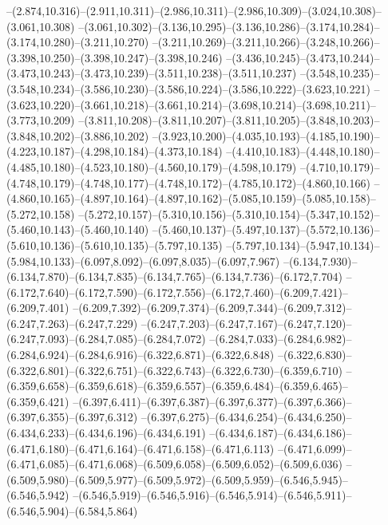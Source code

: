   --(2.874,10.316)--(2.911,10.311)--(2.986,10.311)--(2.986,10.309)--(3.024,10.308)--(3.061,10.308)%
  --(3.061,10.302)--(3.136,10.295)--(3.136,10.286)--(3.174,10.284)--(3.174,10.280)--(3.211,10.270)%
  --(3.211,10.269)--(3.211,10.266)--(3.248,10.266)--(3.398,10.250)--(3.398,10.247)--(3.398,10.246)%
  --(3.436,10.245)--(3.473,10.244)--(3.473,10.243)--(3.473,10.239)--(3.511,10.238)--(3.511,10.237)%
  --(3.548,10.235)--(3.548,10.234)--(3.586,10.230)--(3.586,10.224)--(3.586,10.222)--(3.623,10.221)%
  --(3.623,10.220)--(3.661,10.218)--(3.661,10.214)--(3.698,10.214)--(3.698,10.211)--(3.773,10.209)%
  --(3.811,10.208)--(3.811,10.207)--(3.811,10.205)--(3.848,10.203)--(3.848,10.202)--(3.886,10.202)%
  --(3.923,10.200)--(4.035,10.193)--(4.185,10.190)--(4.223,10.187)--(4.298,10.184)--(4.373,10.184)%
  --(4.410,10.183)--(4.448,10.180)--(4.485,10.180)--(4.523,10.180)--(4.560,10.179)--(4.598,10.179)%
  --(4.710,10.179)--(4.748,10.179)--(4.748,10.177)--(4.748,10.172)--(4.785,10.172)--(4.860,10.166)%
  --(4.860,10.165)--(4.897,10.164)--(4.897,10.162)--(5.085,10.159)--(5.085,10.158)--(5.272,10.158)%
  --(5.272,10.157)--(5.310,10.156)--(5.310,10.154)--(5.347,10.152)--(5.460,10.143)--(5.460,10.140)%
  --(5.460,10.137)--(5.497,10.137)--(5.572,10.136)--(5.610,10.136)--(5.610,10.135)--(5.797,10.135)%
  --(5.797,10.134)--(5.947,10.134)--(5.984,10.133)--(6.097,8.092)--(6.097,8.035)--(6.097,7.967)%
  --(6.134,7.930)--(6.134,7.870)--(6.134,7.835)--(6.134,7.765)--(6.134,7.736)--(6.172,7.704)%
  --(6.172,7.640)--(6.172,7.590)--(6.172,7.556)--(6.172,7.460)--(6.209,7.421)--(6.209,7.401)%
  --(6.209,7.392)--(6.209,7.374)--(6.209,7.344)--(6.209,7.312)--(6.247,7.263)--(6.247,7.229)%
  --(6.247,7.203)--(6.247,7.167)--(6.247,7.120)--(6.247,7.093)--(6.284,7.085)--(6.284,7.072)%
  --(6.284,7.033)--(6.284,6.982)--(6.284,6.924)--(6.284,6.916)--(6.322,6.871)--(6.322,6.848)%
  --(6.322,6.830)--(6.322,6.801)--(6.322,6.751)--(6.322,6.743)--(6.322,6.730)--(6.359,6.710)%
  --(6.359,6.658)--(6.359,6.618)--(6.359,6.557)--(6.359,6.484)--(6.359,6.465)--(6.359,6.421)%
  --(6.397,6.411)--(6.397,6.387)--(6.397,6.377)--(6.397,6.366)--(6.397,6.355)--(6.397,6.312)%
  --(6.397,6.275)--(6.434,6.254)--(6.434,6.250)--(6.434,6.233)--(6.434,6.196)--(6.434,6.191)%
  --(6.434,6.187)--(6.434,6.186)--(6.471,6.180)--(6.471,6.164)--(6.471,6.158)--(6.471,6.113)%
  --(6.471,6.099)--(6.471,6.085)--(6.471,6.068)--(6.509,6.058)--(6.509,6.052)--(6.509,6.036)%
  --(6.509,5.980)--(6.509,5.977)--(6.509,5.972)--(6.509,5.959)--(6.546,5.945)--(6.546,5.942)%
  --(6.546,5.919)--(6.546,5.916)--(6.546,5.914)--(6.546,5.911)--(6.546,5.904)--(6.584,5.864)%
